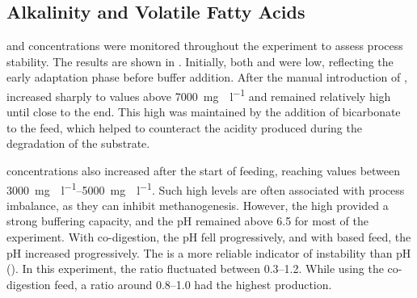 \subsection{Alkalinity and Volatile Fatty Acids}
\label{subsec:alkalinity_vfa}

 and  concentrations were monitored throughout the experiment to assess process stability. The results are shown in . Initially, both  and  were low, reflecting the early adaptation phase before buffer addition. After the manual introduction of ,  increased sharply to values above \qty{7000}{\milli\gram\CaCO\per\litre} and remained relatively high until close to the end. This high  was maintained by the addition of bicarbonate to the feed, which helped to counteract the acidity produced during the degradation of the substrate.

 concentrations also increased after the start of feeding, reaching values between \qtyrange{3000}{5000}{\milli\gram\CHCOOH\per\litre}. Such high  levels are often associated with process imbalance, as they can inhibit methanogenesis. However, the high  provided a strong buffering capacity, and the pH remained above \num{6.5} for most of the experiment. With co-digestion, the pH fell progressively, and with  based feed, the pH increased progressively. The  is a more reliable indicator of instability than pH (). In this experiment, the ratio fluctuated between \numrange{0.3}{1.2}. While using the co-digestion feed, a ratio around \numrange{0.8}{1.0} had the highest production.

